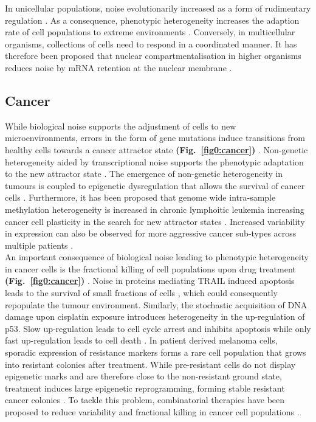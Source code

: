 In unicellular populations, noise evolutionarily increased as a form of rudimentary regulation \citep{Wolf2015}. 
As a consequence, phenotypic heterogeneity increases the adaption rate of cell populations to extreme environments \cite{Bodi2017}. 
Conversely, in multicellular organisms, collections of cells need to respond in a coordinated manner. 
It has therefore been proposed that nuclear compartmentalisation in higher organisms reduces noise by mRNA retention at the nuclear membrane \citep{Battich2013, Stoeger2016}.

\subsection{Cancer}

While biological noise supports the adjustment of cells to new microenvironments, errors in the form of gene mutations induce transitions from healthy cells towards a cancer attractor state \textbf{(Fig.~\ref{fig0:cancer})} \citep{Marusyk2012}. 
Non-genetic heterogeneity aided by transcriptional noise supports the phenotypic adaptation to the new attractor state \citep{Jia2017}. 
The emergence of non-genetic heterogeneity in tumours is coupled to epigenetic dysregulation that allows the survival of cancer cells \citep{Timp2013}. 
Furthermore, it has been proposed that genome wide intra-sample methylation heterogeneity is increased in chronic lymphoitic leukemia increasing cancer cell plasticity in the search for new attractor states \citep{Landau2014}. 
Increased variability in expression can also be observed for more aggressive cancer sub-types across multiple patients \citep{Ecker2015}. \\

An important consequence of biological noise leading to phenotypic heterogeneity in cancer cells is the fractional killing of cell populations upon drug treatment \textbf{(Fig.~\ref{fig0:cancer})} \citep{Flusberg2015}. 
Noise in proteins mediating \Gls{TRAIL} induced apoptosis leads to the survival of small fractions of cells \citep{Spencer2009}, which could consequently repopulate the tumour environment. 
Similarly, the stochastic acquisition of DNA damage upon cisplatin exposure introduces heterogeneity in the up-regulation of p53. 
Slow up-regulation leads to cell cycle arrest and inhibits apoptosis while only fast up-regulation leads to cell death \citep{Paek2016}. 
In patient derived melanoma cells, sporadic expression of resistance markers forms a rare cell population that grows into resistant colonies after treatment. 
While pre-resistant cells do not display epigenetic marks and are therefore close to the non-resistant ground state, treatment induces large epigenetic reprogramming, forming stable resistant cancer colonies \citep{Shaffer2017}. 
To tackle this problem, combinatorial therapies have been proposed to reduce variability and fractional killing in cancer cell populations \cite{Paek2016, Roux2015}.\\

